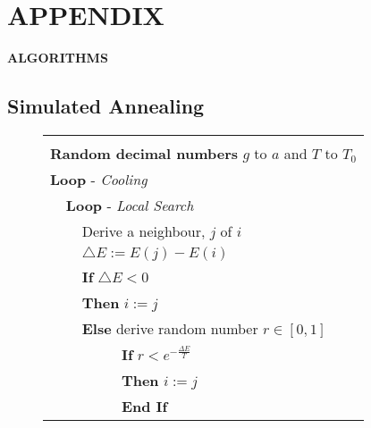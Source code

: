  \chapter*{APPENDIX \thechapter} \label{appendixA}
 \begin{center}
\textbf{ALGORITHMS}
\end{center}
\section*{\thesection \quad Simulated Annealing}

\begin{figure}[h!]
\begin{center}
\begin{footnotesize}
\begin{tabular}{|llll|}\hline%
    &     &     & \\%
\multicolumn{4}{|l|}{\textbf{Random decimal numbers} $g$ to $a$ and $T$ to $T_{0}$} \\%
\multicolumn{4}{|l|}{\textbf{Loop} - {\slshape Cooling}} \\%
    & \multicolumn{3}{l|}{\hspace{0.3cm} \textbf{Loop} - {\slshape Local Search}} \\%
    &     & \multicolumn{2}{l|}{\hspace{0.7cm} Derive a neighbour, $j$ of $i$} \\%
    &     & \multicolumn{2}{l|}{\hspace{0.7cm}$\triangle E:=E(j)-E(i)$ } \\%
    &     & \multicolumn{2}{l|}{\hspace{0.7cm} \textbf{If} $\triangle E < 0$} \\%
    &     & \multicolumn{2}{l|}{\hspace{0.7cm} \textbf{Then} $i:=j$} \\%
    &     & \multicolumn{2}{l|}{\hspace{0.7cm} \textbf{Else} derive random number $r \in [0,1]$} \\%
    &     &     &  \hspace{1.2cm} \textbf{If} $r < e^{ - \frac{{\Delta E}}{T}}$\\%
    &     &     &  \hspace{1.2cm} \textbf{Then} $i:=j$\\%
    &     &     &  \hspace{1.2cm} \textbf{End If} \\%

\end{tabular}
\end{footnotesize}
\end{center}
\end{figure}
